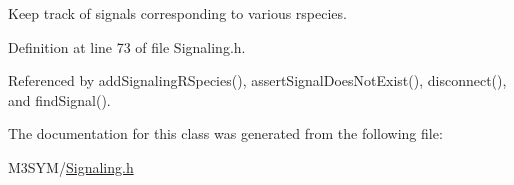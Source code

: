 Keep track of signals corresponding to various rspecies. 



Definition at line 73 of file Signaling.\+h.



Referenced by add\+Signaling\+R\+Species(), assert\+Signal\+Does\+Not\+Exist(), disconnect(), and find\+Signal().



The documentation for this class was generated from the following file\+:\begin{DoxyCompactItemize}
\item 
M3\+S\+Y\+M/\hyperlink{Signaling_8h}{Signaling.\+h}\end{DoxyCompactItemize}
